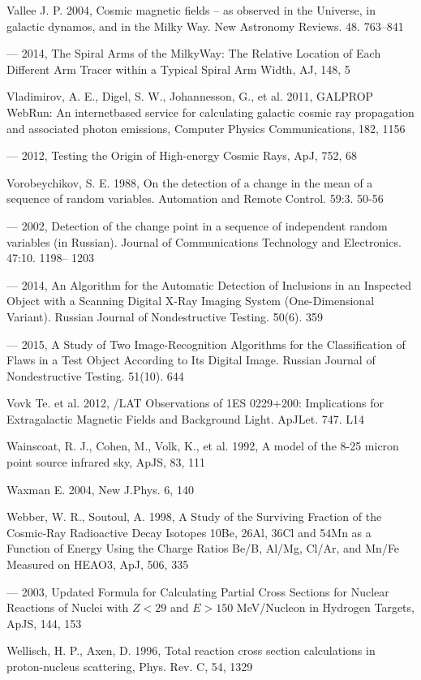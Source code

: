 Vallee J. P. 2004, Cosmic magnetic fields -- as observed in the Universe, in galactic dynamos, and in the Milky Way. New Astronomy Reviews. 48. 763--841

--- 2014, The Spiral Arms of the MilkyWay: The Relative Location of Each Different Arm Tracer within a Typical Spiral Arm Width, AJ, 148, 5

Vladimirov, A. E., Digel, S. W., Johannesson, G., et al. 2011, GALPROP WebRun: An internetbased service for calculating galactic cosmic ray propagation and associated photon emissions, Computer Physics Communications, 182, 1156

--- 2012, Testing the Origin of High-energy Cosmic Rays, ApJ, 752, 68

Vorobeychikov, S. E. 1988, On the detection of a change in the mean of a sequence of random variables. Automation and Remote Control. 59:3. 50-56

--- 2002, Detection of the change point in a sequence of independent random variables (in Russian). Journal of Communications Technology and Electronics. 47:10. 1198-- 1203

--- 2014, An Algorithm for the Automatic Detection of Inclusions in an Inspected Object with a Scanning Digital X-Ray Imaging System (One-Dimensional Variant). Russian Journal of Nondestructive Testing. 50(6). 359

--- 2015, A Study of Two Image-Recognition Algorithms for the Classification of Flaws in a Test Object According to Its Digital Image. Russian Journal of Nondestructive Testing. 51(10). 644

Vovk Te. et al. 2012, \fermi{}/LAT Observations of 1ES 0229+200: Implications for Extragalactic Magnetic Fields and Background Light. ApJLet. 747. L14

Wainscoat, R. J., Cohen, M., Volk, K., et al. 1992, A model of the 8-25 micron point source infrared sky, ApJS, 83, 111

Waxman E. 2004, New J.Phys. 6, 140

Webber, W. R., Soutoul, A. 1998, A Study of the Surviving Fraction of the Cosmic-Ray Radioactive Decay Isotopes 10Be, 26Al, 36Cl and 54Mn as a Function of Energy Using the Charge Ratios Be/B, Al/Mg, Cl/Ar, and Mn/Fe Measured on HEAO3, ApJ, 506, 335

--- 2003, Updated Formula for Calculating Partial Cross Sections for Nuclear Reactions of Nuclei with $Z < 29$ and $E > 150$ MeV/Nucleon in Hydrogen Targets, ApJS, 144, 153

Wellisch, H. P., Axen, D. 1996, Total reaction cross section calculations in proton-nucleus scattering, Phys. Rev. C, 54, 1329

